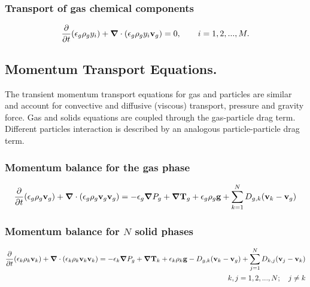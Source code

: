 \subsubsection{\hspace{1cm}Transport of gas chemical components}

\begin{equation}
\frac{\partial}{\partial t}(\epsilon_{g}\rho_{g}y_{i})+
\mbox{\boldmath $\nabla$}\cdot (\epsilon_{g}\rho_{g}y_{i}{\bf v}_{g})=0,
\qquad i=1,2,...,M.
\label{eq:gc_mass}
\end{equation}

\subsection{Momentum Transport Equations.}
The transient momentum transport equations for gas and particles are
similar and account for convective and 
diffusive (viscous) transport, pressure and gravity force. Gas and solids
equations are coupled through the gas-particle drag term. Different particles
interaction is described by an analogous particle-particle drag term.

\subsubsection{\hspace{1cm}Momentum balance for the gas phase}

\begin{equation}
\frac{\partial}{\partial t}(\epsilon_{g}\rho_{g}{\bf v}_{g})+
\mbox{\boldmath $\nabla$}\cdot (\epsilon_{g}\rho_{g}{\bf v}_{g}{\bf v}_{g})=
-\epsilon_{g}\mbox{\boldmath $\nabla$}P_{g}+
\mbox{\boldmath $\nabla$}{\bf T}_{g}
+\epsilon_{g}\rho_{g}{\bf g}+\sum_{k=1}^{N} D_{g,k}({\bf v}_{k}-{\bf v}_{g})
\label{eq:gas_mom}
\end{equation}


\subsubsection{\hspace{1cm}Momentum balance for $N$ solid phases}

\begin{eqnarray}
\frac{\partial}{\partial t}(\epsilon_{k}\rho_{k}{\bf v}_{k})+
\mbox{\boldmath $\nabla$}\cdot (\epsilon_{k}\rho_{k}{\bf v}_{k}{\bf v}_{k}) =
-\epsilon_{k}\mbox{\boldmath $\nabla$}P_{g}+
\mbox{\boldmath $\nabla$}{\bf T}_{k}
+\epsilon_{k}\rho_{k}{\bf g} -
D_{g,k}({\bf v}_{k}-{\bf v}_{g}) + 
\sum_{j=1}^{N} D_{k,j}({\bf v}_{j} - {\bf v}_{k}) \\
\label{eq:solid_mom}
k,j=1,2,...,N; \quad j \neq k
\nonumber
\end{eqnarray}

